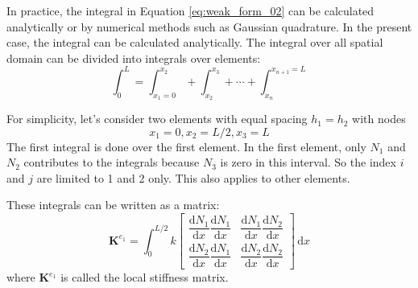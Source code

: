 \documentclass[a4paper,12pt]{article} %
\begin{document}
In practice, the integral in Equation \eqref{eq:weak_form_02} can be
calculated analytically or by numerical methods such as Gaussian quadrature.
In the present case, the integral can be calculated analytically.
The integral over all spatial
domain can be divided into integrals over elements:
\begin{equation}
\int_{0}^{L} = \int_{x_{1}=0}^{x_{2}} + \int_{x_{2}}^{x_{3}} + \cdots +
\int_{x_{n}}^{x_{n+1}=L}
\end{equation}

For simplicity, let's consider two elements with equal spacing
$h_{1} = h_{2}$ with nodes
\begin{equation}
x_{1} = 0, x_{2} = L/2, x_{3} = L
\end{equation}
The first integral is done over the first element. In the first element, only
$N_{1}$ and $N_{2}$ contributes to the integrals because $N_{3}$ is zero in
this interval. So the index $i$ and $j$ are limited to 1 and 2 only.
This also applies to other elements.

These integrals can be written as a matrix:
\begin{equation}
\mathbf{K}^{e_{1}} = \int_{0}^{L/2} k \begin{bmatrix}
\dfrac{\mathrm{d}N_{1}}{\mathrm{d}x} \dfrac{\mathrm{d}N_{1}}{\mathrm{d}x} &
\dfrac{\mathrm{d}N_{1}}{\mathrm{d}x} \dfrac{\mathrm{d}N_{2}}{\mathrm{d}x} \\[10pt]
\dfrac{\mathrm{d}N_{2}}{\mathrm{d}x} \dfrac{\mathrm{d}N_{1}}{\mathrm{d}x} &
\dfrac{\mathrm{d}N_{2}}{\mathrm{d}x} \dfrac{\mathrm{d}N_{2}}{\mathrm{d}x}
\end{bmatrix}\,\mathrm{d}x
\end{equation}
where $\mathbf{K}^{e_{1}}$ is called the local stiffness matrix.
\end{document}
